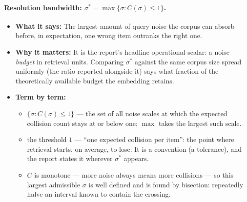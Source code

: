 \documentclass[11pt,letterpaper]{article}
\newcommand{\sstar}{\sigma^{*}}
\begin{document}
\paragraph{Resolution bandwidth: $\sstar = \max\{\sigma : C(\sigma) \le
1\}$.}
\begin{itemize}
  \item \textbf{What it says:} The largest amount of query noise the corpus
  can absorb before, in expectation, one wrong item outranks the right one.
  \item \textbf{Why it matters:} It is the report's headline operational
  scalar: a noise \emph{budget} in retrieval units. Comparing $\sstar$
  against the same corpus size spread uniformly (the ratio reported
  alongside it) says what fraction of the theoretically available budget
  the embedding retains.
  \item \textbf{Term by term:}
  \begin{itemize}
    \item $\{\sigma : C(\sigma) \le 1\}$ --- the set of all noise scales at
    which the expected collision count stays at or below one; $\max$ takes
    the largest such scale.
    \item the threshold $1$ --- ``one expected collision per item'': the
    point where retrieval starts, on average, to lose. It is a convention
    (a tolerance), and the report states it wherever $\sstar$ appears.
    \item $C$ is monotone --- more noise always means more collisions ---
    so this largest admissible $\sigma$ is well defined and is found by
    bisection: repeatedly halve an interval known to contain the crossing.
  \end{itemize}
\end{itemize}
\end{document}
